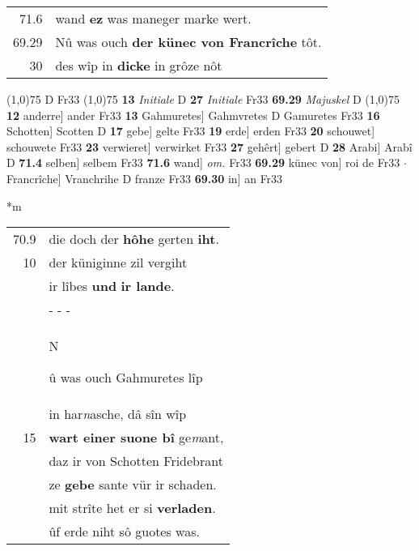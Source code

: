 \documentclass[8pt,a4paper,notitlepage]{article}
\begin{document}
\begin{table}[ht]
\begin{minipage}[t]{0.5\linewidth}
\begin{tabular}{rl}
71.6 & wand \textbf{ez} was maneger marke wert.\\ 
69.29 & Nû was ouch \textbf{der künec von Francrîche} tôt.\\ 
30 & des wîp in \textbf{dicke} in grôze nôt\\ 
\end{tabular}
\scriptsize
\line(1,0){75} \newline
D Fr33 \newline
\line(1,0){75} \newline
\textbf{13} \textit{Initiale} D  \textbf{27} \textit{Initiale} Fr33  \textbf{69.29} \textit{Majuskel} D  \newline
\line(1,0){75} \newline
\textbf{12} anderre] ander Fr33 \textbf{13} Gahmuretes] Gahmvretes D Gamuretes Fr33 \textbf{16} Schotten] Scotten D \textbf{17} gebe] gelte Fr33 \textbf{19} erde] erden Fr33 \textbf{20} schouwet] schouwete Fr33 \textbf{23} verwieret] verwirket Fr33 \textbf{27} gehêrt] gebert D \textbf{28} Arabi] Arabî D \textbf{71.4} selben] selbem Fr33 \textbf{71.6} wand] \textit{om.} Fr33 \textbf{69.29} künec von] roi de Fr33  $\cdot$ Francrîche] Vranchrihe D franze Fr33 \textbf{69.30} in] an Fr33 \newline
\end{minipage}
\hspace{0.5cm}
\begin{minipage}[t]{0.5\linewidth}
\small
\begin{center}*m
\end{center}
\begin{tabular}{rl}
70.9 & die doch der \textbf{hôhe} gerten \textbf{iht}.\\ 
10 & der küniginne zil vergiht\\ 
 & ir lîbes \textbf{und} \textbf{ir lande}.\\ 
 & \multicolumn{1}{l}{ - - - }\\ 
 & \begin{large}N\end{large}û was ouch Gahmuretes lîp\\ 
 & in har\textit{n}asche, dâ sîn wîp\\ 
15 & \textbf{wart einer suone bî} ge\textit{m}ant,\\ 
 & daz ir von Schotten Fridebrant\\ 
 & ze \textbf{gebe} sante vür ir schaden.\\ 
 & mit strîte het er si \textbf{verladen}.\\ 
 & ûf erde niht sô guotes was.\\ 

\end{tabular}
\end{minipage}
\end{table}
\end{document}
